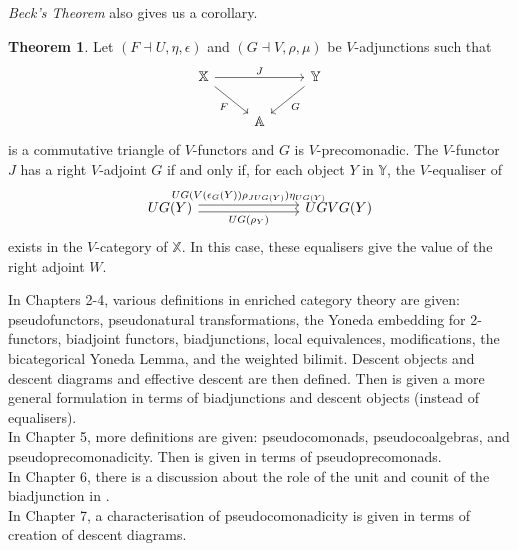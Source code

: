 \documentclass{article}
\numberwithin{equation}{section}
\theoremstyle{definition}
\newtheorem{thm}{Theorem}[section]
\theoremstyle{definition}
\theoremstyle{remark}
\theoremstyle{remark}
\begin{document}
		\textit{Beck's Theorem} also gives us a corollary.

	\begin{thm}
				Let $ (F \dashv U, \eta, \epsilon)$ and $ (G \dashv V, \rho, \mu)$ be $ V$-adjunctions such that 		
			\[\begin{tikzcd}
				{\mathbb{X}} && {\mathbb{Y}} \\
				& {\mathbb{A}}
				\arrow["J", from=1-1, to=1-3]
				\arrow["F"', from=1-1, to=2-2]
				\arrow["G", from=1-3, to=2-2]
			\end{tikzcd}\]	
		is a commutative triangle of $V$-functors and $ G$ is $V$-precomonadic. The $ V$-functor $ J$ has a right $V$-adjoint $G$ if and only if, for each object $Y$ in $ \mathbb{Y}$, the $V$-equaliser of
			\[\begin{tikzcd}
				{UG(Y)} &&& {UGVG(Y)}
				\arrow["{UG(V(\epsilon_G(Y))\rho_{JUG(Y)})\eta_{UG(Y)}}", shift left, from=1-1, to=1-4]
				\arrow["{UG(\rho_Y)}"', shift right, from=1-1, to=1-4]
			\end{tikzcd}\]	
		exists in the $V$-category of $ \mathbb{X}$.
		In this case, these equalisers give the value of the right adjoint $ W$.

	\end{thm}
		
		In Chapters 2-4, various definitions in enriched category theory are given: pseudofunctors, pseudonatural transformations, the Yoneda embedding for 2-functors, biadjoint functors, biadjunctions, local equivalences, modifications, the bicategorical Yoneda Lemma, and the weighted bilimit.
		Descent objects and descent diagrams and effective descent are then defined.
		Then  is given a more general formulation in terms of biadjunctions and descent objects (instead of equalisers).\\

		In Chapter 5, more definitions are given: pseudocomonads, pseudocoalgebras, and pseudoprecomonadicity. 
		Then  is given in terms of pseudoprecomonads.\\

		In Chapter 6, there is a discussion about the role of the unit and counit of the biadjunction in .\\

		In Chapter 7, a characterisation of pseudocomonadicity is given in terms of creation of descent diagrams.\\
\end{document}

